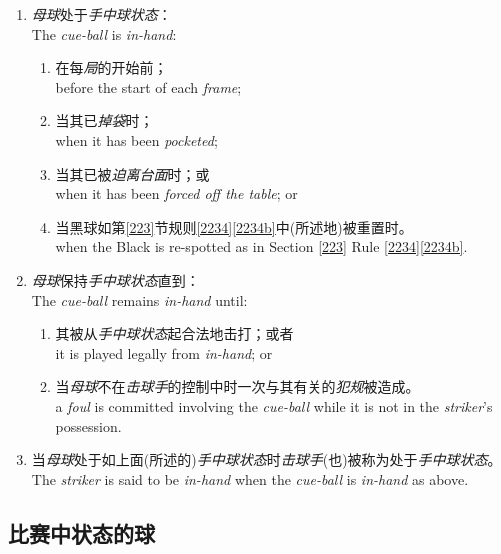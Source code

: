 \begin{enumerate}[label=(\alph*)]
    \item \emph{母球}处于\emph{手中球状态}：\\
    The \emph{cue-ball} is \emph{in-hand}:
    \begin{enumerate}[label=(\roman*)]
        \item 在每\emph{局}的开始前；\\
        before the start of each \emph{frame};
        \item 当其已\emph{掉袋}时；\\
        when it has been \emph{pocketed};
        \item 当其已被\emph{迫离台面}时；或\\
        when it has been \emph{forced off the table}; or
        \item 当黑球如第\ref{223}节规则\ref{2234}\ref{2234b}中(所述地)被重置时。\\
        when the Black is re-spotted as in Section \ref{223} Rule \ref{2234}\ref{2234b}.
    \end{enumerate}
    \item \emph{母球}保持\emph{手中球状态}直到：\\
    The \emph{cue-ball} remains \emph{in-hand} until:
    \begin{enumerate}[label=(\roman*)]
        \item 其被从\emph{手中球状态}起合法地击打；或者\\
        it is played legally from \emph{in-hand}; or
        \item 当\emph{母球}不在\emph{击球手}的控制中时一次与其有关的\emph{犯规}被造成。\\
        a \emph{foul} is committed involving the \emph{cue-ball} while it is not in the \emph{striker}'s possession.
    \end{enumerate}
    \item 当\emph{母球}处于如上面(所述的)\emph{手中球状态}时\emph{击球手}(也)被称为处于\emph{手中球状态}。\\
    The \emph{striker} is said to be \emph{in-hand} when the \emph{cue-ball} is \emph{in-hand} as above.
\end{enumerate}

\subsection{比赛中状态的球}

